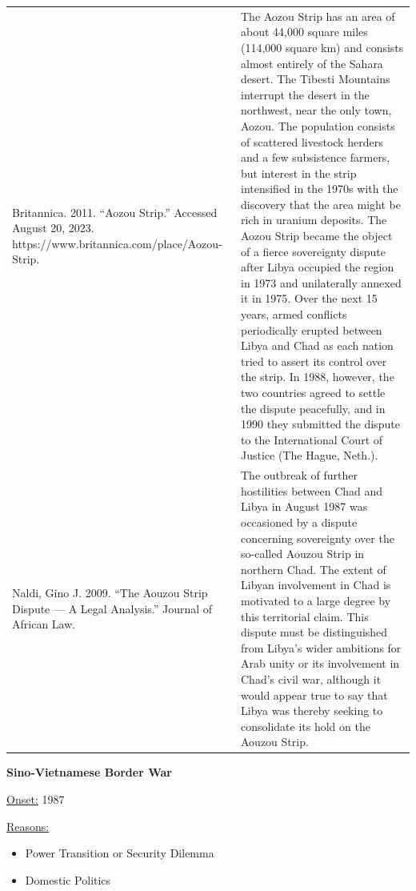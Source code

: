 {\begin{longtable}{p{}p{}}
\\
Britannica. 2011. “Aozou Strip.” Accessed August 20, 2023. https://www.britannica.com/place/Aozou-Strip. & The Aozou Strip has an area of about 44,000 square miles (114,000 square km) and consists almost entirely of the Sahara desert. The Tibesti Mountains interrupt the desert in the northwest, near the only town, Aozou. The population consists of scattered livestock herders and a few subsistence farmers, but interest in the strip intensified in the 1970s with the discovery that the area might be rich in uranium deposits. The Aozou Strip became the object of a fierce sovereignty dispute after Libya occupied the region in 1973 and unilaterally annexed it in 1975. Over the next 15 years, armed conflicts periodically erupted between Libya and Chad as each nation tried to assert its control over the strip. In 1988, however, the two countries agreed to settle the dispute peacefully, and in 1990 they submitted the dispute to the International Court of Justice (The Hague, Neth.).
\\
Naldi, Gino J. 2009. “The Aouzou Strip Dispute — A Legal Analysis.” Journal of African Law. & The outbreak of further hostilities between Chad and Libya in August 1987 was occasioned by a dispute concerning sovereignty over the so-called Aouzou Strip in northern Chad. The extent of Libyan involvement in Chad is motivated to a large degree by this territorial claim. This dispute must be distinguished from Libya's wider ambitions for Arab unity or its involvement in Chad's civil war, although it would appear true to say that Libya was thereby seeking to consolidate its hold on the Aouzou Strip.
\\
\end{longtable}}
\clearpage
         \textbf{Sino-Vietnamese Border War} 

          \underline{Onset:} 1987         

\underline{Reasons:}
\begin{itemize}
\item Power Transition or Security Dilemma
\item Domestic Politics
\end{itemize}

